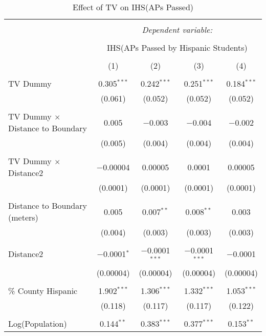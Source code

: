 
\begin{table}[!htbp] \centering 
  \caption{Effect of TV on IHS(APs Passed)} 
  \label{} 
\begin{tabular}{@{\extracolsep{-2pt}}lcccc} 
\\[-1.8ex]\hline 
\hline \\[-1.8ex] 
 & \multicolumn{4}{c}{\textit{Dependent variable:}} \\ 
\cline{2-5} 
\\[-1.8ex] & \multicolumn{4}{c}{IHS(APs Passed by Hispanic Students)} \\ 
\\[-1.8ex] & (1) & (2) & (3) & (4)\\ 
\hline \\[-1.8ex] 
 TV Dummy & 0.305$^{***}$ & 0.242$^{***}$ & 0.251$^{***}$ & 0.184$^{***}$ \\ 
  & (0.061) & (0.052) & (0.052) & (0.052) \\ 
  & & & & \\ 
 TV Dummy $\times$ Distance to Boundary & 0.005 & $-$0.003 & $-$0.004 & $-$0.002 \\ 
  & (0.005) & (0.004) & (0.004) & (0.004) \\ 
  & & & & \\ 
 TV Dummy $\times$ Distance2 & $-$0.00004 & 0.00005 & 0.0001 & 0.00005 \\ 
  & (0.0001) & (0.0001) & (0.0001) & (0.0001) \\ 
  & & & & \\ 
 Distance to Boundary (meters) & 0.005 & 0.007$^{**}$ & 0.008$^{**}$ & 0.003 \\ 
  & (0.004) & (0.003) & (0.003) & (0.003) \\ 
  & & & & \\ 
 Distance2 & $-$0.0001$^{*}$ & $-$0.0001$^{***}$ & $-$0.0001$^{***}$ & $-$0.0001 \\ 
  & (0.00004) & (0.00004) & (0.00004) & (0.00004) \\ 
  & & & & \\ 
 \% County Hispanic & 1.902$^{***}$ & 1.306$^{***}$ & 1.332$^{***}$ & 1.053$^{***}$ \\ 
  & (0.118) & (0.117) & (0.117) & (0.122) \\ 
  & & & & \\ 
 Log(Population) & 0.144$^{**}$ & 0.383$^{***}$ & 0.377$^{***}$ & 0.153$^{**}$ \\ 

\end{tabular}
\end{table}
